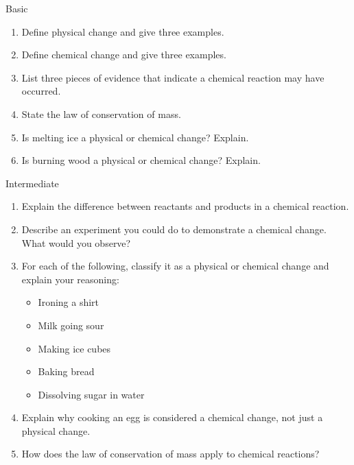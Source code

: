 \begin{tieredquestions}{Basic}
\begin{enumerate}
    \item  Define physical change and give three examples.
    \item  Define chemical change and give three examples.
    \item  List three pieces of evidence that indicate a chemical reaction may have occurred.
    \item  State the law of conservation of mass.
    \item  Is melting ice a physical or chemical change? Explain.
    \item  Is burning wood a physical or chemical change? Explain.
\end{enumerate}
\end{tieredquestions}

\begin{tieredquestions}{Intermediate}
\begin{enumerate}
    \item  Explain the difference between reactants and products in a chemical reaction.
    \item  Describe an experiment you could do to demonstrate a chemical change. What would you observe?
    \item  For each of the following, classify it as a physical or chemical change and explain your reasoning:
        \begin{itemize}
            \item  Ironing a shirt
            \item  Milk going sour
            \item  Making ice cubes
            \item  Baking bread
            \item  Dissolving sugar in water
        \end{itemize}
    \item  Explain why cooking an egg is considered a chemical change, not just a physical change.
    \item  How does the law of conservation of mass apply to chemical reactions?
\end{enumerate}
\end{tieredquestions}

